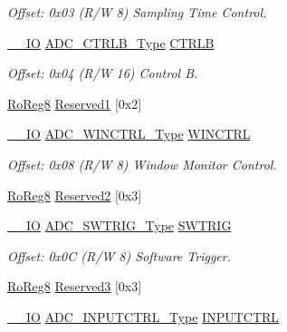 \begin{DoxyCompactItemize}
\begin{DoxyCompactList}\small\item\em Offset\+: 0x03 (R/W 8) Sampling Time Control. \end{DoxyCompactList}\item 
\mbox{\hyperlink{core__cm0plus_8h_aec43007d9998a0a0e01faede4133d6be}{\+\_\+\+\_\+\+IO}} \mbox{\hyperlink{union_a_d_c___c_t_r_l_b___type}{A\+D\+C\+\_\+\+C\+T\+R\+L\+B\+\_\+\+Type}} \mbox{\hyperlink{struct_adc_ab3298e405dd12dec99aee4f03244f33d}{C\+T\+R\+LB}}
\begin{DoxyCompactList}\small\item\em Offset\+: 0x04 (R/W 16) Control B. \end{DoxyCompactList}\item 
\mbox{\hyperlink{group___s_a_m_d21_e15_a__definitions_ga0d957f1433aaf5d70e4dc2b68288442d}{Ro\+Reg8}} \mbox{\hyperlink{struct_adc_a3e42d171d4eb8eda7a030a3453f2d9c0}{Reserved1}} \mbox{[}0x2\mbox{]}
\item 
\mbox{\hyperlink{core__cm0plus_8h_aec43007d9998a0a0e01faede4133d6be}{\+\_\+\+\_\+\+IO}} \mbox{\hyperlink{union_a_d_c___w_i_n_c_t_r_l___type}{A\+D\+C\+\_\+\+W\+I\+N\+C\+T\+R\+L\+\_\+\+Type}} \mbox{\hyperlink{struct_adc_af51b5f058c3651b68fa343a3786fffa0}{W\+I\+N\+C\+T\+RL}}
\begin{DoxyCompactList}\small\item\em Offset\+: 0x08 (R/W 8) Window Monitor Control. \end{DoxyCompactList}\item 
\mbox{\hyperlink{group___s_a_m_d21_e15_a__definitions_ga0d957f1433aaf5d70e4dc2b68288442d}{Ro\+Reg8}} \mbox{\hyperlink{struct_adc_a3e3d4b7e35d84b272d434a1396e8b7be}{Reserved2}} \mbox{[}0x3\mbox{]}
\item 
\mbox{\hyperlink{core__cm0plus_8h_aec43007d9998a0a0e01faede4133d6be}{\+\_\+\+\_\+\+IO}} \mbox{\hyperlink{union_a_d_c___s_w_t_r_i_g___type}{A\+D\+C\+\_\+\+S\+W\+T\+R\+I\+G\+\_\+\+Type}} \mbox{\hyperlink{struct_adc_a9f54c185286f264f17586934957c3f18}{S\+W\+T\+R\+IG}}
\begin{DoxyCompactList}\small\item\em Offset\+: 0x0C (R/W 8) Software Trigger. \end{DoxyCompactList}\item 
\mbox{\hyperlink{group___s_a_m_d21_e15_a__definitions_ga0d957f1433aaf5d70e4dc2b68288442d}{Ro\+Reg8}} \mbox{\hyperlink{struct_adc_ab22abf5c83fa4a01809facc55e0fda29}{Reserved3}} \mbox{[}0x3\mbox{]}
\item 
\mbox{\hyperlink{core__cm0plus_8h_aec43007d9998a0a0e01faede4133d6be}{\+\_\+\+\_\+\+IO}} \mbox{\hyperlink{union_a_d_c___i_n_p_u_t_c_t_r_l___type}{A\+D\+C\+\_\+\+I\+N\+P\+U\+T\+C\+T\+R\+L\+\_\+\+Type}} \mbox{\hyperlink{struct_adc_aca7d1b7b8c0fcf60fb5b8210a1f8801e}{I\+N\+P\+U\+T\+C\+T\+RL}}

\end{DoxyCompactItemize}
